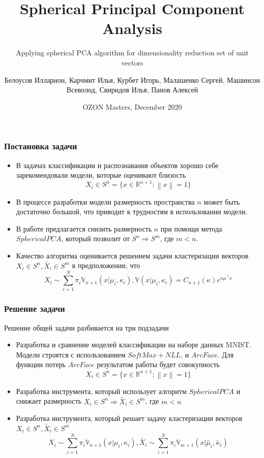 \documentclass{beamer}
\title[Spherical Principal Component Analysis]{Spherical Principal Component Analysis}
\subtitle{Applying spherical PCA algorithm for dimensionality reduction set of unit vectors}
\author[] { Белоусов Илларион, Карчмит Илья, Курбет Игорь, Малашенко Сергей, Машинсон Всеволод, Свиридов Илья, Панов Алексей }
\date[]{OZON Masters, December 2020}
\begin{document}
\frame{\titlepage}

\begin{frame}
\frametitle{Постановка задачи}
\begin{itemize}
 \item В задачах классификации и распознавания объектов хорошо себе зарекомендовали модели, которые оценивают близость 
 $$X_i \in S^n = \{ x \in \mathbb{R}^{n+1} : \left\lVert x \right\rVert=1 \}$$
 \item В процессе разработки модели размерность пространства $n$ может быть достаточно большой, что приводит к трудностям в использовании модели.
 \item В работе предлагается снизить размерность $n$ при помощи метода $SphericalPCA$, который позволит от $S^n \Rightarrow S^m$, где $m < n$.
 \item Качество алгоритма оценивается решением задачи кластеризации векторов $X_i \in S^n, \tilde{X_i} \in S^m$ в предположении, что $$X_i \sim \sum_{i=1}^{N}\pi_i \mathbb{V}_{n+1}(x | \mu_i, \kappa_i), \mathbb{V}(x | \mu_i, \kappa_i)=C_{n+1}(\kappa) e^{\kappa \mu^{\top} x}$$
\end{itemize}
\end{frame}

\begin{frame}
\frametitle{Решение задачи}
Решение общей задачи разбивается на три подзадачи
\begin{itemize}
 \item Разработка и сравнение моделей классификации на наборе данных MNIST. Модели строятся с использованием $SoftMax + NLL$, и $ArcFace$. Для функции потерь $ArcFace$ результатом работы будет совокупность $$X_i \in S^n = \{ x \in \mathbb{R}^{n+1} : \left\lVert x \right\rVert=1 \}$$
\item Разработка инструмента, который использует алгоритм $SphericalPCA$ и снижает размерность $X_i \in S^n \Rightarrow \tilde{X_i} \in S^m$, где $m < n$
\item Разработка инструмента, который решает задачу кластеризации векторов 
$X_i \in S^n, \tilde{X_i} \in S^m$ 
$$X_i \sim \sum_{i=1}^{N}\pi_i \mathbb{V}_{n+1}(x | \mu_i, \kappa_i), \tilde{X_i} \sim \sum_{i=1}^{N}\pi_i \mathbb{V}_{m+1}(x | \tilde{\mu_i}, \tilde{\kappa_i})$$
\end{itemize}

\end{frame}
\end{document}
